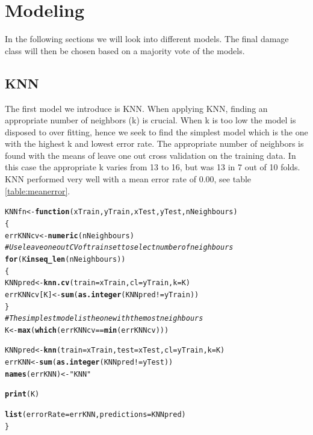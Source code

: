 \documentclass[a4paper,draft=false]{scrreprt}\usepackage[]{graphicx}\usepackage[]{color}
\makeatletter
\newcommand{\hlstr}[1]{\textcolor[rgb]{0.192,0.494,0.8}{#1}}%
\newcommand{\hlcom}[1]{\textcolor[rgb]{0.678,0.584,0.686}{\textit{#1}}}%
\newcommand{\hlopt}[1]{\textcolor[rgb]{0,0,0}{#1}}%
\newcommand{\hlstd}[1]{\textcolor[rgb]{0.345,0.345,0.345}{#1}}%
\newcommand{\hlkwa}[1]{\textcolor[rgb]{0.161,0.373,0.58}{\textbf{#1}}}%
\newcommand{\hlkwb}[1]{\textcolor[rgb]{0.69,0.353,0.396}{#1}}%
\newcommand{\hlkwc}[1]{\textcolor[rgb]{0.333,0.667,0.333}{#1}}%
\newcommand{\hlkwd}[1]{\textcolor[rgb]{0.737,0.353,0.396}{\textbf{#1}}}%
\newenvironment{kframe}{%
 \def\at@end@of@kframe{}%
 \ifinner\ifhmode%
  \def\at@end@of@kframe{\end{minipage}}%
  \begin{minipage}{\columnwidth}%
 \fi\fi%
 \def\FrameCommand##1{\hskip\@totalleftmargin \hskip-\fboxsep
 \colorbox{shadecolor}{##1}\hskip-\fboxsep
     \hskip-\linewidth \hskip-\@totalleftmargin \hskip\columnwidth}%
 \MakeFramed {\advance\hsize-\width
   \@totalleftmargin\z@ \linewidth\hsize
   \@setminipage}}%
 {\par\unskip\endMakeFramed%
 \at@end@of@kframe}
\newenvironment{knitrout}{}{} %
\makeatother
\begin{document}
{\let\clearpage\relax \chapter{Modeling}}


In the following sections we will look into different models. The final damage class will then be chosen based on a majority vote of the models.

\section{KNN} %
The first model we introduce is KNN. When applying KNN, finding an appropriate number of neighbors (k) is crucial. When k is too low the model is disposed to over fitting, hence we seek to find the simplest model which is the one with the highest k and lowest error rate. The appropriate number of neighbors is found with the means of leave one out cross validation on the training data. In this case the appropriate k varies from 13 to 16, but was 13 in 7 out of 10 folds. KNN performed very well with a mean error rate of 0.00, see table \ref{table:meanerror}.
\begin{knitrout}
\color{fgcolor}\begin{kframe}
\begin{alltt}
\hlstd{KNNfn} \hlkwb{<-} \hlkwa{function}\hlstd{(}\hlkwc{xTrain}\hlstd{,} \hlkwc{yTrain}\hlstd{,} \hlkwc{xTest}\hlstd{,} \hlkwc{yTest}\hlstd{,} \hlkwc{nNeighbours}\hlstd{)}
\hlstd{\{}
    \hlstd{errKNNcv} \hlkwb{<-} \hlkwd{numeric}\hlstd{(nNeighbours)}
    \hlcom{# Use leave one out CV of train set to select number of neighbours}
    \hlkwa{for} \hlstd{(K} \hlkwa{in} \hlkwd{seq_len}\hlstd{(nNeighbours))}
    \hlstd{\{}
      \hlstd{KNNpred} \hlkwb{<-} \hlkwd{knn.cv}\hlstd{(}\hlkwc{train} \hlstd{= xTrain,} \hlkwc{cl} \hlstd{= yTrain,} \hlkwc{k} \hlstd{= K)}
      \hlstd{errKNNcv[K]} \hlkwb{<-} \hlkwd{sum}\hlstd{(}\hlkwd{as.integer}\hlstd{(KNNpred} \hlopt{!=} \hlstd{yTrain))}
    \hlstd{\}}
    \hlcom{# The simplest model is the one with the most neighbours}
    \hlstd{K} \hlkwb{<-} \hlkwd{max}\hlstd{(}\hlkwd{which}\hlstd{(errKNNcv} \hlopt{==} \hlkwd{min}\hlstd{(errKNNcv)))}

    \hlstd{KNNpred} \hlkwb{<-} \hlkwd{knn}\hlstd{(}\hlkwc{train} \hlstd{= xTrain,} \hlkwc{test} \hlstd{= xTest,} \hlkwc{cl} \hlstd{= yTrain,} \hlkwc{k} \hlstd{= K)}
    \hlstd{errKNN} \hlkwb{<-} \hlkwd{sum}\hlstd{(}\hlkwd{as.integer}\hlstd{(KNNpred} \hlopt{!=} \hlstd{yTest))}
    \hlkwd{names}\hlstd{(errKNN)} \hlkwb{<-} \hlstr{"KNN"}

    \hlkwd{print}\hlstd{(K)}

    \hlkwd{list}\hlstd{(}\hlkwc{errorRate} \hlstd{= errKNN,} \hlkwc{predictions} \hlstd{= KNNpred)}
\hlstd{\}}
\end{alltt}
\end{kframe}
\end{knitrout}
\end{document}
